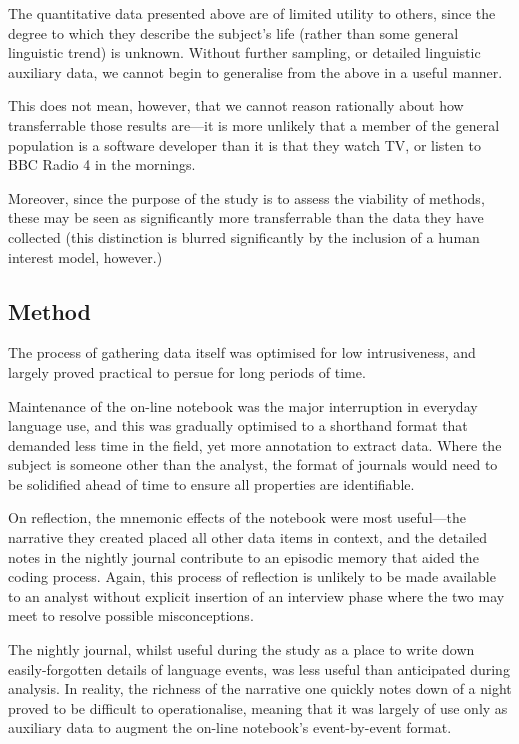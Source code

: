 

The quantitative data presented above are of limited utility to others, since the degree to which they describe the subject's life (rather than some general linguistic trend) is unknown.  Without further sampling, or detailed linguistic auxiliary data, we cannot begin to generalise from the above in a useful manner.

This does not mean, however, that we cannot reason rationally about how transferrable those results are---it is more unlikely that a member of the general population is a software developer than it is that they watch TV, or listen to BBC Radio 4 in the mornings.

Moreover, since the purpose of the study is to assess the viability of methods, these may be seen as significantly more transferrable than the data they have collected (this distinction is blurred significantly by the inclusion of a human interest model, however.)






\subsection{Method}
The process of gathering data itself was optimised for low intrusiveness, and largely proved practical to persue for long periods of time.

Maintenance of the on-line notebook was the major interruption in everyday language use, and this was gradually optimised to a shorthand format that demanded less time in the field, yet more annotation to extract data.  Where the subject is someone other than the analyst, the format of journals would need to be solidified ahead of time to ensure all properties are identifiable.

On reflection, the mnemonic effects of the notebook were most useful---the narrative they created placed all other data items in context, and the detailed notes in the nightly journal contribute to an episodic memory that aided the coding process.  Again, this process of reflection is unlikely to be made available to an analyst without explicit insertion of an interview phase where the two may meet to resolve possible misconceptions.

The nightly journal, whilst useful during the study as a place to write down easily-forgotten details of language events, was less useful than anticipated during analysis.  In reality, the richness of the narrative one quickly notes down of a night proved to be difficult to operationalise, meaning that it was largely of use only as auxiliary data to augment the on-line notebook's event-by-event format.

